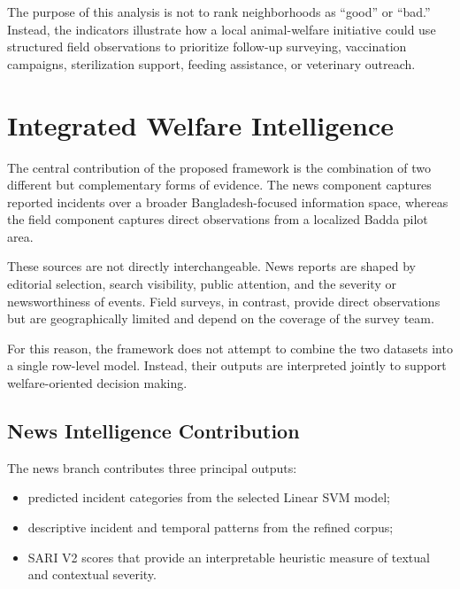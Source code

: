 \documentclass[conference]{IEEEtran}
\begin{document}
The purpose of this analysis is not to rank neighborhoods as ``good'' or
``bad.'' Instead, the indicators illustrate how a local animal-welfare
initiative could use structured field observations to prioritize follow-up
surveying, vaccination campaigns, sterilization support, feeding assistance,
or veterinary outreach.


\section{Integrated Welfare Intelligence}

The central contribution of the proposed framework is the combination of two
different but complementary forms of evidence. The news component captures
reported incidents over a broader Bangladesh-focused information space,
whereas the field component captures direct observations from a localized
Badda pilot area.

These sources are not directly interchangeable. News reports are shaped by
editorial selection, search visibility, public attention, and the severity or
newsworthiness of events. Field surveys, in contrast, provide direct
observations but are geographically limited and depend on the coverage of the
survey team.

For this reason, the framework does not attempt to combine the two datasets
into a single row-level model. Instead, their outputs are interpreted jointly
to support welfare-oriented decision making.

\subsection{News Intelligence Contribution}

The news branch contributes three principal outputs:

\begin{itemize}
    \item predicted incident categories from the selected Linear SVM model;
    \item descriptive incident and temporal patterns from the refined corpus;
    \item SARI V2 scores that provide an interpretable heuristic measure of
    textual and contextual severity.
\end{itemize}
\end{document}
